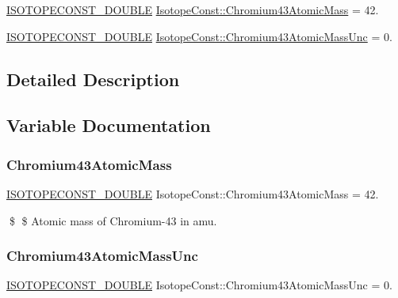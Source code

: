 \begin{DoxyCompactItemize}
\item 
\mbox{\hyperlink{group___isotope_const-_macros_ga8f45a7272ce02c0b4c65c44636ed719a}{I\+S\+O\+T\+O\+P\+E\+C\+O\+N\+S\+T\+\_\+\+D\+O\+U\+B\+LE}} \mbox{\hyperlink{group___isotope_const-_chromium-_cr43_gaf7e56564059b50a943008986bc3d8913}{Isotope\+Const\+::\+Chromium43\+Atomic\+Mass}} = 42.
\item 
\mbox{\hyperlink{group___isotope_const-_macros_ga8f45a7272ce02c0b4c65c44636ed719a}{I\+S\+O\+T\+O\+P\+E\+C\+O\+N\+S\+T\+\_\+\+D\+O\+U\+B\+LE}} \mbox{\hyperlink{group___isotope_const-_chromium-_cr43_ga1145eb459cebdbfdd279cd1e72d26309}{Isotope\+Const\+::\+Chromium43\+Atomic\+Mass\+Unc}} = 0.
\end{DoxyCompactItemize}


\subsection{Detailed Description}


\subsection{Variable Documentation}
\mbox{\label{group___isotope_const-_chromium-_cr43_gaf7e56564059b50a943008986bc3d8913}} 
\subsubsection{\texorpdfstring{Chromium43\+Atomic\+Mass}{Chromium43AtomicMass}}
{\footnotesize\ttfamily \mbox{\hyperlink{group___isotope_const-_macros_ga8f45a7272ce02c0b4c65c44636ed719a}{I\+S\+O\+T\+O\+P\+E\+C\+O\+N\+S\+T\+\_\+\+D\+O\+U\+B\+LE}} Isotope\+Const\+::\+Chromium43\+Atomic\+Mass = 42.}

\$ \$ Atomic mass of Chromium-\/43 in amu. \mbox{\label{group___isotope_const-_chromium-_cr43_ga1145eb459cebdbfdd279cd1e72d26309}} 
\subsubsection{\texorpdfstring{Chromium43\+Atomic\+Mass\+Unc}{Chromium43AtomicMassUnc}}
{\footnotesize\ttfamily \mbox{\hyperlink{group___isotope_const-_macros_ga8f45a7272ce02c0b4c65c44636ed719a}{I\+S\+O\+T\+O\+P\+E\+C\+O\+N\+S\+T\+\_\+\+D\+O\+U\+B\+LE}} Isotope\+Const\+::\+Chromium43\+Atomic\+Mass\+Unc = 0.}

